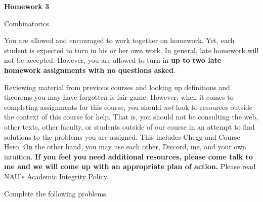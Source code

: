 \documentclass[11pt]{article}%
\theoremstyle{definition}
\newcommand{\blankline}{\pagebreak[2]\vspace{.5\baselineskip}}
\begin{document}
\begin{center}
{\Large\bf Homework 3}

\smallskip

Combinatorics
\end{center}

\thispagestyle{fancy}

You are allowed and encouraged to work together on homework. Yet, each student is expected to turn in his or her own work. In general, late homework will not be accepted. However, you are allowed to turn in \textbf{up to two late homework assignments with no questions asked}. 

\blankline

Reviewing material from previous courses and looking up definitions and theorems you may have forgotten is fair game. However, when it comes to completing assignments for this course, you should \emph{not} look to resources outside the context of this course for help.  That is, you should not be consulting the web, other texts, other faculty, or students outside of our course in an attempt to find solutions to the problems you are assigned.  This includes Chegg and Course Hero. On the other hand, you may use each other, Discord, me, and your own intuition. \textbf{If you feel you need additional resources, please come talk to me and we will come up with an appropriate plan of action.} Please read NAU's \href{https://www5.nau.edu/policies/Client/Details/828?whoIsLooking=Students&pertainsTo=All&sortDirection=Ascending&page=1}{Academic Integrity Policy}.

\blankline

Complete the following problems. 
\end{document}
